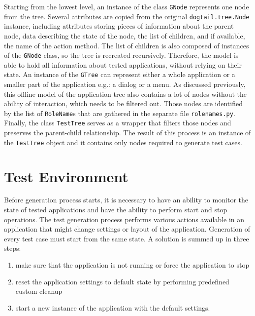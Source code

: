 Starting from the lowest level, an instance of the class \texttt{GNode} represents one node from the tree. Several attributes are copied from the original \texttt{dogtail.tree.Node} instance, including attributes storing pieces of information about the parent node, data describing the state of the node, the list of children, and if available, the name of the action method. The list of children is also composed of instances of the \texttt{GNode} class, so the tree is recreated recursively. Therefore, the model is able to hold all information about tested applications, without relying on their state. An instance of the \texttt{GTree} can represent either a whole application or a smaller part of the application e.g.: a dialog or a menu. As discussed previously, this offline model of the application tree also contains a lot of nodes without the ability of interaction, which needs to be filtered out. Those nodes are identified by the list of \texttt{RoleName}s that are gathered in the separate file \texttt{rolenames.py}. Finally, the class \texttt{TestTree} serves as a wrapper that filters those nodes and preserves the parent-child relationship. The result of this process is an instance of the \texttt{TestTree} object and it contains only nodes required to generate test cases. 
\section{Test Environment}
Before generation process starts, it is necessary to have an ability to monitor the state of tested applications and have the ability to perform start and stop operations. The test generation process performs various actions available in an application that might change settings or layout of the application. Generation of every test case must start from the same state. A solution is summed up in three steps:
\begin{enumerate}
    \item make sure that the application is not running or force the application to stop
    \item reset the application settings to default state by performing predefined custom cleanup
    \item start a new instance of the application with the default settings.
\end{enumerate}

